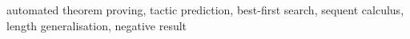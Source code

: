 automated theorem proving, tactic prediction, best-first search, sequent calculus, length generalisation, negative result
